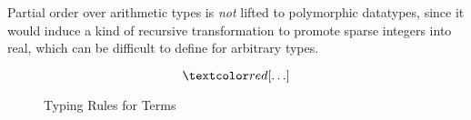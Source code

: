 Partial order over arithmetic types is \emph{not} lifted to polymorphic datatypes, since it would induce a kind of recursive transformation to promote sparse integers into real, which can be difficult to define for arbitrary types.

\begin{figure}[p]
  \[
  \TODO
  \]
  \caption{Typing Rules for Terms}
  \label{typing-terms}
\end{figure}
